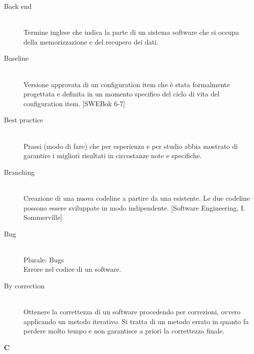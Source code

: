 \begin{description}\item[Back end] \hfill \\
Termine inglese che indica la parte di un sistema software che si occupa della memorizzazione e del recupero dei dati.
 \item[Baseline] \hfill \\
Versione approvata di un configuration item che è stata	formalmente progettata e definita in un momento specifico del ciclo di vita del configuration item. [SWEBok 6-7]
 \item[Best practice] \hfill \\
Prassi (modo di fare) che per esperienza e per studio abbia mostrato di garantire i migliori risultati in circostanze note e specifiche.
 \item[Branching] \hfill \\
Creazione di una nuova codeline a partire da una esistente. Le due codeline possono essere sviluppate in modo indipendente. [Software Engineering, I. Sommerville]
 \item[Bug] \hfill \\
Plurale: Bugs\\ 
Errore nel codice di un software.
 \item[By correction] \hfill \\
Ottenere la correttezza di un software procedendo per correzioni, ovvero applicando un metodo iterativo. Si tratta di un metodo errato in quanto fa perdere molto tempo e non garantisce a priori la correttezza finale.
 \end{description}
\newpage 
\begin{center}\textbf{\Huge{C}}\end{center}
